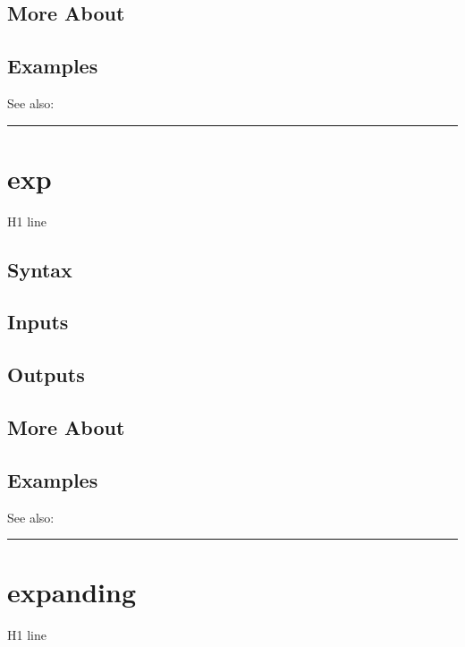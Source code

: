 \documentclass[letterpaper,10pt,english]{sphinxmanual}
\begin{document}
\subsection{More About}
\label{classes/time_series/@ts/ts:id213}

\subsection{Examples}
\label{classes/time_series/@ts/ts:id214}
See also:


\bigskip\hrule{}\bigskip



\section{exp}
\label{classes/time_series/@ts/ts:id215}\label{classes/time_series/@ts/ts:exp}
H1 line


\subsection{Syntax}
\label{classes/time_series/@ts/ts:id216}

\subsection{Inputs}
\label{classes/time_series/@ts/ts:id217}

\subsection{Outputs}
\label{classes/time_series/@ts/ts:id218}

\subsection{More About}
\label{classes/time_series/@ts/ts:id219}

\subsection{Examples}
\label{classes/time_series/@ts/ts:id220}
See also:


\bigskip\hrule{}\bigskip



\section{expanding}
\label{classes/time_series/@ts/ts:expanding}\label{classes/time_series/@ts/ts:id221}
H1 line
\end{document}
